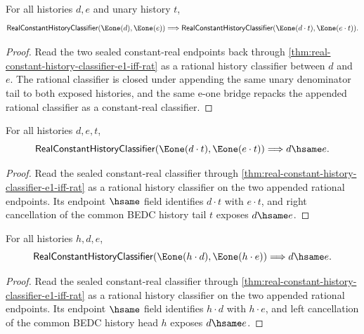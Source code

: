\begin{theorem}
\label{thm:real-constant-history-classifier-append-unary-tail-closed}
For all histories $d,e$ and unary history $t$,
$$
\mathsf{RealConstantHistoryClassifier}(\Eone(d),\Eone(e))
\Longrightarrow
\mathsf{RealConstantHistoryClassifier}(\Eone(d\cdot t),\Eone(e\cdot t)).
$$
\end{theorem}
\begin{proof}
Read the two sealed constant-real endpoints back through
\autoref{thm:real-constant-history-classifier-e1-iff-rat} as a rational
history classifier between $d$ and $e$. The rational classifier is closed under
appending the same unary denominator tail to both exposed histories, and the
same e-one bridge repacks the appended rational classifier as a constant-real
classifier.
\end{proof}

\begin{theorem}
\label{thm:real-constant-history-classifier-append-common-tail-cancel}
For all histories $d,e,t$,
$$
\mathsf{RealConstantHistoryClassifier}(\Eone(d\cdot t),\Eone(e\cdot t))
\Longrightarrow d\hsame e.
$$
\end{theorem}
\begin{proof}
Read the sealed constant-real classifier through
\autoref{thm:real-constant-history-classifier-e1-iff-rat} as a rational
history classifier on the two appended rational endpoints. Its endpoint
$\hsame$ field identifies $d\cdot t$ with $e\cdot t$, and right cancellation
of the common BEDC history tail $t$ exposes $d\hsame e$.
\end{proof}

\begin{theorem}
\label{thm:real-constant-history-classifier-append-common-head-cancel}
For all histories $h,d,e$,
$$
\mathsf{RealConstantHistoryClassifier}(\Eone(h\cdot d),\Eone(h\cdot e))
\Longrightarrow d\hsame e.
$$
\end{theorem}
\begin{proof}
Read the sealed constant-real classifier through
\autoref{thm:real-constant-history-classifier-e1-iff-rat} as a rational
history classifier on the two appended rational endpoints. Its endpoint
$\hsame$ field identifies $h\cdot d$ with $h\cdot e$, and left cancellation
of the common BEDC history head $h$ exposes $d\hsame e$.
\end{proof}

